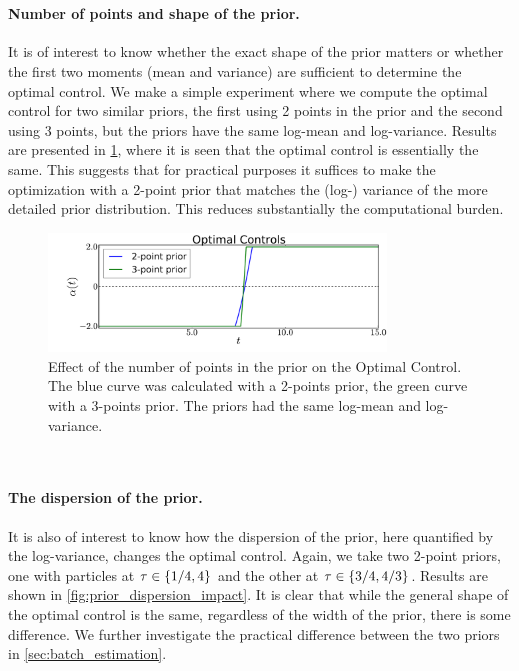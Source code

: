 \documentclass{article}
\begin{document}
\

\paragraph{Number of points and shape of the prior.} 
It is of interest to know whether the exact shape of the prior matters or whether the first two
moments (mean and variance) are sufficient to determine the optimal control. We
make a simple experiment where we compute the optimal control for two
similar priors, the first using 2 points 
in the prior and the second using 3 points, but the priors have the same
log-mean and log-variance. Results are presented in
\cref{fig:prior_shape_impact}, where it is seen that
the optimal control is essentially the same. This suggests that for practical
purposes it suffices to make the optimization with a 2-point prior that matches
the (log-) variance of the more detailed prior distribution. This
reduces substantially the computational burden.



\begin{figure}[htp]
\begin{center}
  \includegraphics[width=0.8\textwidth]{Figs/AdjointOptimizer/NumberOfTausEffect.pdf}
  \caption[Effect of number of points in prior on Optimal Control]{Effect of the
  number of points in the prior on the Optimal Control. The blue curve was calculated with a 2-points prior, the
  green curve with a 3-points prior. The priors had the same log-mean and log-variance. } 
  \label{fig:prior_shape_impact}
\end{center}
\end{figure}

\

\paragraph{The dispersion of the prior.}
It is also of
interest to know how the dispersion of the prior, here quantified
by the log-variance, changes the optimal control. Again, we take two
2-point priors, one with 
particles at ${ \tau } \in \{1/4, 4\}$ and the other at ${ \tau } \in
\{3/4,4/3\}$. Results
are shown in \cref{fig:prior_dispersion_impact}. It is clear that while the
general shape of the optimal control is the same, regardless of the width of
the prior, there is some difference. We further investigate the
practical difference between the two priors in 
\cref{sec:batch_estimation}.
 
\end{document}
